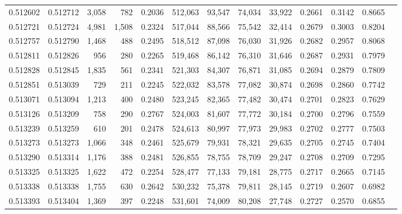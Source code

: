 \begin{tabular}{rrrrrrrrrrrrr}
0.512602 & 0.512712 &  3,058 &   782 &                                     0.2036 & 512,063 &  93,547 &  74,034 &  33,922 & 0.2661 & 0.3142 & 0.8665 \\
0.512721 & 0.512724 &  4,981 & 1,508 &                                     0.2324 & 517,044 &  88,566 &  75,542 &  32,414 & 0.2679 & 0.3003 & 0.8204 \\
0.512757 & 0.512790 &  1,468 &   488 &                                     0.2495 & 518,512 &  87,098 &  76,030 &  31,926 & 0.2682 & 0.2957 & 0.8068 \\
0.512811 & 0.512826 &    956 &   280 &                                     0.2265 & 519,468 &  86,142 &  76,310 &  31,646 & 0.2687 & 0.2931 & 0.7979 \\
0.512828 & 0.512845 &  1,835 &   561 &                                     0.2341 & 521,303 &  84,307 &  76,871 &  31,085 & 0.2694 & 0.2879 & 0.7809 \\
0.512851 & 0.513039 &    729 &   211 &                                     0.2245 & 522,032 &  83,578 &  77,082 &  30,874 & 0.2698 & 0.2860 & 0.7742 \\
0.513071 & 0.513094 &  1,213 &   400 &                                     0.2480 & 523,245 &  82,365 &  77,482 &  30,474 & 0.2701 & 0.2823 & 0.7629 \\
0.513126 & 0.513209 &    758 &   290 &                                     0.2767 & 524,003 &  81,607 &  77,772 &  30,184 & 0.2700 & 0.2796 & 0.7559 \\
0.513239 & 0.513259 &    610 &   201 &                                     0.2478 & 524,613 &  80,997 &  77,973 &  29,983 & 0.2702 & 0.2777 & 0.7503 \\
0.513273 & 0.513273 &  1,066 &   348 &                                     0.2461 & 525,679 &  79,931 &  78,321 &  29,635 & 0.2705 & 0.2745 & 0.7404 \\
0.513290 & 0.513314 &  1,176 &   388 &                                     0.2481 & 526,855 &  78,755 &  78,709 &  29,247 & 0.2708 & 0.2709 & 0.7295 \\
0.513325 & 0.513325 &  1,622 &   472 &                                     0.2254 & 528,477 &  77,133 &  79,181 &  28,775 & 0.2717 & 0.2665 & 0.7145 \\
0.513338 & 0.513338 &  1,755 &   630 &                                     0.2642 & 530,232 &  75,378 &  79,811 &  28,145 & 0.2719 & 0.2607 & 0.6982 \\
0.513393 & 0.513404 &  1,369 &   397 &                                     0.2248 & 531,601 &  74,009 &  80,208 &  27,748 & 0.2727 & 0.2570 & 0.6855 \\

\end{tabular}
